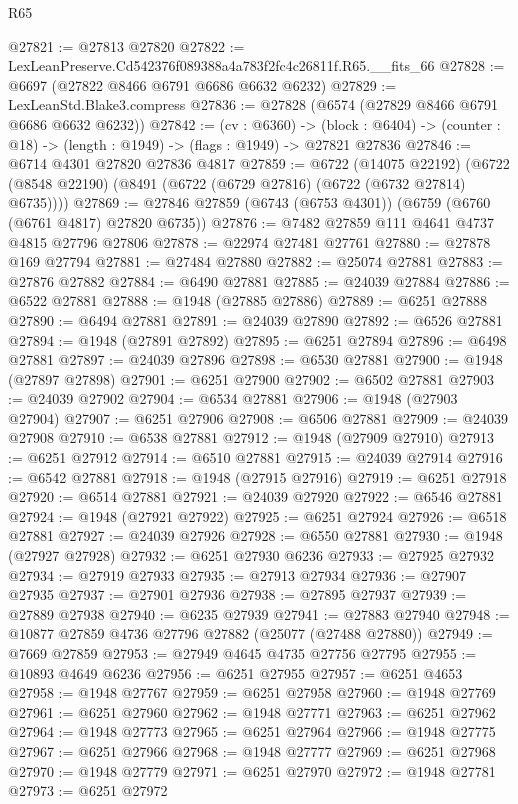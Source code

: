 \begin{lexlean}{R65}
\begin{coremodule}
{@27821 := @27813 @27820
@27822 := LexLeanPreserve.Cd542376f089388a4a783f2fc4c26811f.R65.__fits_66
@27828 := @6697 (@27822 @8466 @6791 @6686 @6632 @6232)
@27829 := LexLeanStd.Blake3.compress
@27836 := @27828 (@6574 (@27829 @8466 @6791 @6686 @6632 @6232))
@27842 := (cv : @6360) ->
  (block : @6404) -> (counter : @18) -> (length : @1949) -> (flags : @1949) -> @27821 @27836
@27846 := @6714 @4301 @27820 @27836 @4817
@27859 := @6722
    (@14075 @22192)
    (@6722 (@8548 @22190) (@8491 (@6722 (@6729 @27816) (@6722 (@6732 @27814) @6735))))
@27869 := @27846 @27859 (@6743 (@6753 @4301)) (@6759 (@6760 (@6761 @4817) @27820 @6735))
@27876 := @7482 @27859 @111 @4641 @4737 @4815 @27796 @27806
@27878 := @22974 @27481 @27761
@27880 := @27878 @169 @27794
@27881 := @27484 @27880
@27882 := @25074 @27881
@27883 := @27876 @27882
@27884 := @6490 @27881
@27885 := @24039 @27884
@27886 := @6522 @27881
@27888 := @1948 (@27885 @27886)
@27889 := @6251 @27888
@27890 := @6494 @27881
@27891 := @24039 @27890
@27892 := @6526 @27881
@27894 := @1948 (@27891 @27892)
@27895 := @6251 @27894
@27896 := @6498 @27881
@27897 := @24039 @27896
@27898 := @6530 @27881
@27900 := @1948 (@27897 @27898)
@27901 := @6251 @27900
@27902 := @6502 @27881
@27903 := @24039 @27902
@27904 := @6534 @27881
@27906 := @1948 (@27903 @27904)
@27907 := @6251 @27906
@27908 := @6506 @27881
@27909 := @24039 @27908
@27910 := @6538 @27881
@27912 := @1948 (@27909 @27910)
@27913 := @6251 @27912
@27914 := @6510 @27881
@27915 := @24039 @27914
@27916 := @6542 @27881
@27918 := @1948 (@27915 @27916)
@27919 := @6251 @27918
@27920 := @6514 @27881
@27921 := @24039 @27920
@27922 := @6546 @27881
@27924 := @1948 (@27921 @27922)
@27925 := @6251 @27924
@27926 := @6518 @27881
@27927 := @24039 @27926
@27928 := @6550 @27881
@27930 := @1948 (@27927 @27928)
@27932 := @6251 @27930 @6236
@27933 := @27925 @27932
@27934 := @27919 @27933
@27935 := @27913 @27934
@27936 := @27907 @27935
@27937 := @27901 @27936
@27938 := @27895 @27937
@27939 := @27889 @27938
@27940 := @6235 @27939
@27941 := @27883 @27940
@27948 := @10877 @27859 @4736 @27796 @27882 (@25077 (@27488 @27880))
@27949 := @7669 @27859
@27953 := @27949 @4645 @4735 @27756 @27795
@27955 := @10893 @4649 @6236
@27956 := @6251 @27955
@27957 := @6251 @4653
@27958 := @1948 @27767
@27959 := @6251 @27958
@27960 := @1948 @27769
@27961 := @6251 @27960
@27962 := @1948 @27771
@27963 := @6251 @27962
@27964 := @1948 @27773
@27965 := @6251 @27964
@27966 := @1948 @27775
@27967 := @6251 @27966
@27968 := @1948 @27777
@27969 := @6251 @27968
@27970 := @1948 @27779
@27971 := @6251 @27970
@27972 := @1948 @27781
@27973 := @6251 @27972
}
\end{coremodule}
\end{lexlean}
